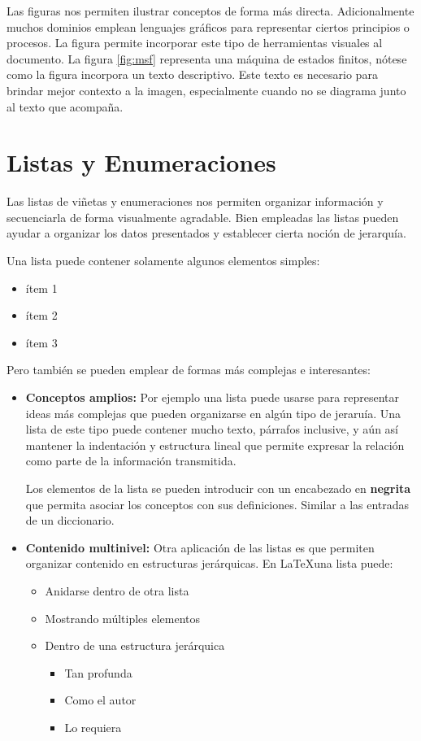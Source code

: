 \documentclass{report}
\begin{document}
Las figuras nos permiten ilustrar conceptos de forma más directa. Adicionalmente muchos dominios emplean lenguajes gráficos para representar ciertos principios o procesos. La figura permite incorporar este tipo de herramientas visuales al documento. 
La figura \ref{fig:msf} representa una máquina de estados finitos, nótese como la figura incorpora un texto descriptivo. Este texto es necesario para brindar mejor contexto a la imagen, especialmente cuando no se diagrama junto al texto que acompaña.

\section{Listas y Enumeraciones}\label{listas}

Las listas de viñetas y enumeraciones nos permiten organizar información y secuenciarla de forma visualmente agradable. Bien empleadas las listas pueden ayudar a organizar los datos presentados y establecer cierta noción de jerarquía.

Una lista puede contener solamente algunos elementos simples:
\begin{itemize}
    \item ítem 1
    \item ítem 2
    \item ítem 3
\end{itemize}

Pero también se pueden emplear de formas más complejas e interesantes:

\begin{itemize}
    \item \textbf{Conceptos amplios:} Por ejemplo una lista puede usarse para representar ideas más complejas que pueden organizarse en algún tipo de jeraruía. 
    Una lista de este tipo puede contener mucho texto, párrafos inclusive, y aún así mantener la indentación y estructura lineal que permite expresar la relación como parte de la información transmitida.
    
    Los elementos de la lista se pueden introducir con un encabezado en \textbf{negrita} que permita asociar los conceptos con sus definiciones. Similar a las entradas de un diccionario.
    
    \item \textbf{Contenido multinivel:} Otra aplicación de las listas es que permiten organizar contenido en estructuras jerárquicas. En \LaTeX una lista puede:
    
    \begin{itemize}
        \item Anidarse dentro de otra lista
        \item Mostrando múltiples elementos
        \item Dentro de una estructura jerárquica
        \begin{itemize}
            \item Tan profunda
            \item Como el autor
            \item Lo requiera
        \end{itemize}
    \end{itemize}
\end{itemize}
\end{document}
